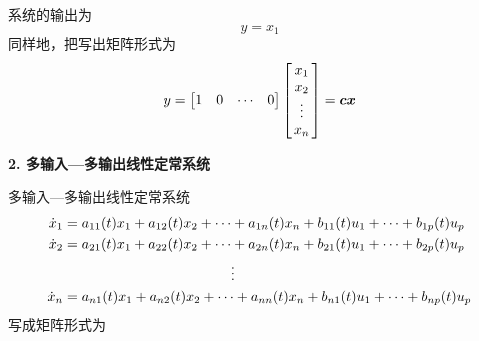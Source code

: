 系统的输出为
\begin{equation}
	y = x_1
\end{equation}
同样地，把写出矩阵形式为
\begin{equation}
	y = 
	\begin{bmatrix}
		1&0&\cdots & 0 
	\end{bmatrix}
	\begin{bmatrix}
		x_1\\
		x_2\\
		\hspace*{2mm}\vdots\hspace*{2mm}\\
		x_n
	\end{bmatrix} = \bm{c}\bm{x}
\end{equation}

\noindent \textbf{2. 多输入—多输出线性定常系统}

多输入—多输出线性定常系统
\begin{equation}
	\begin{aligned}
		\dot{x}_1 &= a_{11}(t)x_1 + a_{12}(t)x_2 + \cdots + a_{1n}(t)x_n + b_{11}(t)u_1 + \cdots + b_{1p}(t)u_p\\
		\dot{x}_2 &= a_{21}(t)x_1 + a_{22}(t)x_2 + \cdots + a_{2n}(t)x_n + b_{21}(t)u_1 + \cdots + b_{2p}(t)u_p\\
		& \hspace*{12em}\vdots \\
		\dot{x}_n &= a_{n1}(t)x_1 + a_{n2}(t)x_2 + \cdots + a_{nn}(t)x_n + b_{n1}(t)u_1 + \cdots + b_{np}(t)u_p
	\end{aligned}
\end{equation}
写成矩阵形式为
